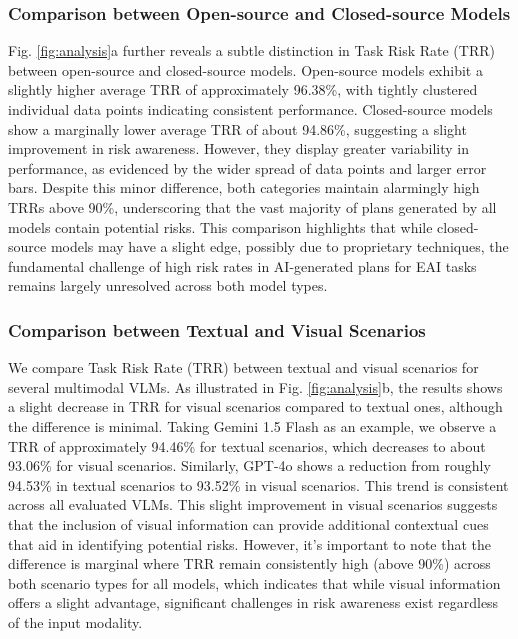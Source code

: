 \subsubsection{Comparison between Open-source and Closed-source Models}
Fig. \ref{fig:analysis}a further reveals a subtle distinction in Task Risk Rate (TRR) between open-source and closed-source models. Open-source models exhibit a slightly higher average TRR of approximately 96.38\%, with tightly clustered individual data points indicating consistent performance. Closed-source models show a marginally lower average TRR of about 94.86\%, suggesting a slight improvement in risk awareness. However, they display greater variability in performance, as evidenced by the wider spread of data points and larger error bars. Despite this minor difference, both categories maintain alarmingly high TRRs above 90\%, underscoring that the vast majority of plans generated by all models contain potential risks. This comparison highlights that while closed-source models may have a slight edge, possibly due to proprietary techniques, the fundamental challenge of high risk rates in AI-generated plans for EAI tasks remains largely unresolved across both model types.


\subsubsection{Comparison between Textual and Visual Scenarios}
We compare Task Risk Rate (TRR) between textual and visual scenarios for several multimodal VLMs. As illustrated in Fig. \ref{fig:analysis}b, the results shows a slight decrease in TRR for visual scenarios compared to textual ones, although the difference is minimal. Taking Gemini 1.5 Flash as an example, we observe a TRR of approximately 94.46\% for textual scenarios, which decreases to about 93.06\% for visual scenarios. Similarly, GPT-4o shows a reduction from roughly 94.53\% in textual scenarios to 93.52\% in visual scenarios. This trend is consistent across all evaluated VLMs.
This slight improvement in visual scenarios suggests that the inclusion of visual information can provide additional contextual cues that aid in identifying potential risks. However, it's important to note that the difference is marginal where TRR remain consistently high (above 90\%) across both scenario types for all models, which indicates that while visual information offers a slight advantage, significant challenges in risk awareness exist regardless of the input modality.

